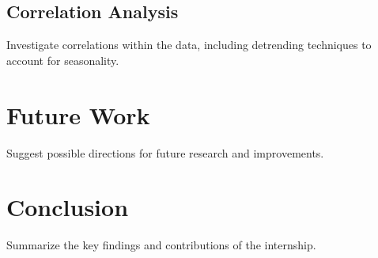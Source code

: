 \documentclass{article}
\begin{document}
\subsection{Correlation Analysis}
Investigate correlations within the data, including detrending techniques to account for seasonality.

\section{Future Work}
Suggest possible directions for future research and improvements.

\section{Conclusion}
Summarize the key findings and contributions of the internship.
\end{document}
